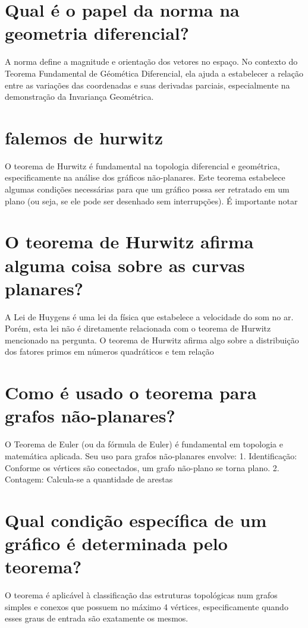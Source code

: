 \documentclass[11pt,a4paper]{article}
\begin{document}
\section{Qual é o papel da norma na geometria diferencial?}
A norma define a magnitude e orientação dos vetores no espaço. No contexto do Teorema Fundamental de Géomética Diferencial, ela ajuda a estabelecer a relação entre as variações das coordenadas e suas derivadas parciais, especialmente na demonstração da Invariança Geométrica.

\section{falemos de hurwitz}
O teorema de Hurwitz é fundamental na topologia diferencial e geométrica, especificamente na análise dos gráficos não-planares. Este teorema estabelece algumas condições necessárias para que um gráfico possa ser retratado em um plano (ou seja, se ele pode ser desenhado sem interrupções). É importante notar

\section{O teorema de Hurwitz afirma alguma coisa sobre as curvas planares?}
A Lei de Huygens é uma lei da física que estabelece a velocidade do som no ar. Porém, esta lei não é diretamente relacionada com o teorema de Hurwitz mencionado na pergunta. O teorema de Hurwitz afirma algo sobre a distribuição dos fatores primos em números quadráticos e tem relação

\section{Como é usado o teorema para grafos não-planares?}
O Teorema de Euler (ou da fórmula de Euler) é fundamental em topologia e matemática aplicada. Seu uso para grafos não-planares envolve: 1. Identificação: Conforme os vértices são conectados, um grafo não-plano se torna plano. 2. Contagem: Calcula-se a quantidade de arestas

\section{Qual condição específica de um gráfico é determinada pelo teorema?}
O teorema é aplicável à classificação das estruturas topológicas num grafos simples e conexos que possuem no máximo 4 vértices, especificamente quando esses graus de entrada são exatamente os mesmos.
\end{document}
